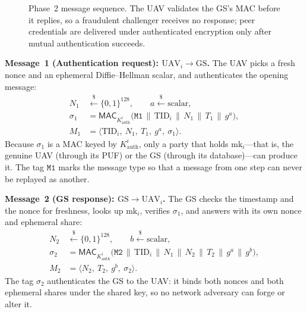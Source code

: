\documentclass[11pt,a4paper]{article}
\begin{document}
\begin{figure}[H]
\centering
{}
\caption{Phase~2 message sequence. The UAV validates the GS's MAC before it
replies, so a fraudulent challenger receives no response; peer credentials are
delivered under authenticated encryption only after mutual authentication
succeeds.}
\label{fig:phase2}
\end{figure}

\textbf{Message~1 (Authentication request): $\text{UAV}_i \rightarrow \text{GS}$.}
The UAV picks a fresh nonce and an ephemeral Diffie--Hellman scalar, and
authenticates the opening message:
\begin{align}
N_1 &\xleftarrow{\$} \{0,1\}^{128}, \qquad a \xleftarrow{\$} \text{scalar}, \\[1ex]
\sigma_1 &= \mathsf{MAC}_{K^{i}_{\text{auth}}}\big(\texttt{M1}\,\|\,\text{TID}_i\,\|\,N_1\,\|\,T_1\,\|\,g^{a}\big), \\[1ex]
M_1 &= \langle \text{TID}_i,\ N_1,\ T_1,\ g^{a},\ \sigma_1 \rangle.
\end{align}
Because $\sigma_1$ is a MAC keyed by $K^{i}_{\text{auth}}$, only a party that
holds $\text{mk}_i$---that is, the genuine UAV (through its PUF) or the GS
(through its database)---can produce it. The tag $\texttt{M1}$ marks the
message type so that a message from one step can never be replayed as another.

\textbf{Message~2 (GS response): $\text{GS} \rightarrow \text{UAV}_i$.}
The GS checks the timestamp and the nonce for freshness, looks up
$\text{mk}_i$, verifies $\sigma_1$, and answers with its own nonce and
ephemeral share:
\begin{align}
N_2 &\xleftarrow{\$} \{0,1\}^{128}, \qquad b \xleftarrow{\$} \text{scalar}, \\[1ex]
\sigma_2 &= \mathsf{MAC}_{K^{i}_{\text{auth}}}\big(\texttt{M2}\,\|\,\text{TID}_i\,\|\,N_1\,\|\,N_2\,\|\,T_2\,\|\,g^{a}\,\|\,g^{b}\big), \\[1ex]
M_2 &= \langle N_2,\ T_2,\ g^{b},\ \sigma_2 \rangle.
\end{align}
The tag $\sigma_2$ authenticates the GS to the UAV: it binds both nonces and
both ephemeral shares under the shared key, so no network adversary can forge
or alter it.
\end{document}
